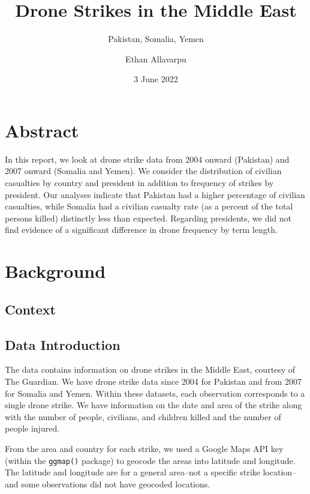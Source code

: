 \documentclass[
]{article}
\title{Drone Strikes in the Middle East}
\subtitle{Pakistan, Somalia, Yemen}
\author{Ethan Allavarpu}
\date{3 June 2022}
\begin{document}
\maketitle

{
\setcounter{tocdepth}{1}
\tableofcontents
}
\vfill

\hypertarget{abstract}{%
\section{Abstract}\label{abstract}}

In this report, we look at drone strike data from 2004 onward (Pakistan)
and 2007 onward (Somalia and Yemen). We consider the distribution of
civilian casualties by country and president in addition to frequency of
strikes by president. Our analyses indicate that Pakistan had a higher
percentage of civilian casualties, while Somalia had a civilian casualty
rate (as a percent of the total persons killed) distinctly less than
expected. Regarding presidents, we did not find evidence of a
significant difference in drone frequency by term length.

\pagebreak

\hypertarget{background}{%
\section{Background}\label{background}}

\hypertarget{context}{%
\subsection{Context}\label{context}}

\hypertarget{data-introduction}{%
\subsection{Data Introduction}\label{data-introduction}}

The data contains information on drone strikes in the Middle East,
courtesy of The Guardian. We have drone strike data since 2004 for
Pakistan and from 2007 for Somalia and Yemen. Within these datasets,
each observation corresponds to a single drone strike. We have
information on the date and area of the strike along with the number of
people, civilians, and children killed and the number of people injured.

From the area and country for each strike, we used a Google Maps API key
(within the \texttt{ggmap()} package) to geocode the areas into latitude
and longitude. The latitude and longitude are for a general area--not a
specific strike location--and some observations did not have geocoded
locations.
\end{document}
